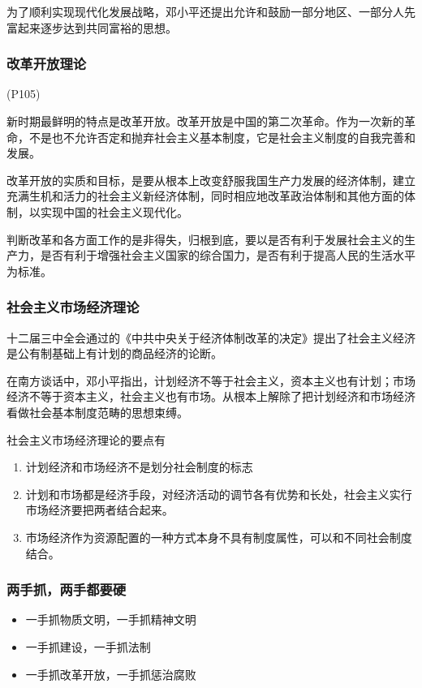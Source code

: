         为了顺利实现现代化发展战略，邓小平还提出允许和鼓励一部分地区、一部分人先富起来逐步达到共同富裕的思想。

        \subsubsection{改革开放理论}
        (P105)

        新时期最鲜明的特点是改革开放。改革开放是中国的第二次革命。作为一次新的革命，不是也不允许否定和抛弃社会主义基本制度，它是社会主义制度的自我完善和发展。
        
        改革开放的实质和目标，是要从根本上改变舒服我国生产力发展的经济体制，建立充满生机和活力的社会主义新经济体制，同时相应地改革政治体制和其他方面的体制，以实现中国的社会主义现代化。

        判断改革和各方面工作的是非得失，归根到底，要以是否有利于发展社会主义的生产力，是否有利于增强社会主义国家的综合国力，是否有利于提高人民的生活水平为标准。

        \subsubsection{社会主义市场经济理论}
        十二届三中全会通过的《中共中央关于经济体制改革的决定》提出了社会主义经济是公有制基础上有计划的商品经济的论断。

        在南方谈话中，邓小平指出，计划经济不等于社会主义，资本主义也有计划；市场经济不等于资本主义，社会主义也有市场。从根本上解除了把计划经济和市场经济看做社会基本制度范畴的思想束缚。

        社会主义市场经济理论的要点有
        \begin{enumerate}
            \item 计划经济和市场经济不是划分社会制度的标志
            \item 计划和市场都是经济手段，对经济活动的调节各有优势和长处，社会主义实行市场经济要把两者结合起来。
            \item 市场经济作为资源配置的一种方式本身不具有制度属性，可以和不同社会制度结合。
        \end{enumerate}

        \subsubsection{两手抓，两手都要硬}
        \begin{itemize}
            \item 一手抓物质文明，一手抓精神文明
            \item 一手抓建设，一手抓法制
            \item 一手抓改革开放，一手抓惩治腐败
        \end{itemize}

